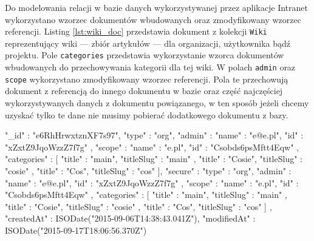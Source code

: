 Do modelowania relacji w bazie danych wykorzystywanej przez aplikacje Intranet wykorzystano wzorzec dokumentów wbudowanych oraz zmodyfikowany wzorzec referencji. Listing \ref{lst:wiki_doc} przedstawia dokument z kolekcji \verb|Wiki| reprezentujący wiki --- zbiór artykułów --- dla organizacji, użytkownika bądź projektu. \newline
Pole \verb|categories| przedstawia wykorzystanie wzorca dokumentów wbudowanych do przechowywania kategorii dla tej wiki. W polach \verb|admin| oraz \verb|scope| wykorzystano zmodyfikowany wzorzec referencji. Pola te przechowują dokument z referencją do innego dokumentu w bazie oraz część najczęściej wykorzystywanych danych z dokumentu powiązanego, w ten sposób jeżeli chcemy uzyskać tylko te dane nie musimy pobierać dodatkowego dokumentu z bazy.
\begin{js}[caption={{Przykładowy dokument z kolekcji \textit{Wiki}}},label={lst:wiki_doc}]
{
        "_id" : "e6RhHrwxtznXF7s97",
        "type" : "org",
        "admin" : {
                "name" : "e@e.pl",
                "id" : "xZxtZ9JqoWzzZ7f7g"
        },
        "scope" : {
                "name" : "e.pl",
                "id" : "Csobds6psMftt4Eqw"
        },
        "categories" : [
                {
                        "title" : "main",
                        "titleSlug" : "main"
                },
                {
                        "title" : "Cosie",
                        "titleSlug" : "cosie"
                },
                {
                        "title" : "Cos",
                        "titleSlug" : "cos"
                }
        ],
        "secure" : {
                "type" : "org",
                "admin" : {
                        "name" : "e@e.pl",
                        "id" : "xZxtZ9JqoWzzZ7f7g"
                },
                "scope" : {
                        "name" : "e.pl",
                        "id" : "Csobds6psMftt4Eqw"
                },
                "categories" : [
                        {
                                "title" : "main",
                                "titleSlug" : "main"
                        },
                        {
                                "title" : "Cosie",
                                "titleSlug" : "cosie"
                        },
                        {
                                "title" : "Cos",
                                "titleSlug" : "cos"
                        }
                ]
        },
        "createdAt" : ISODate("2015-09-06T14:38:43.041Z"),
        "modifiedAt" : ISODate("2015-09-17T18:06:56.370Z")
}


\end{js}

